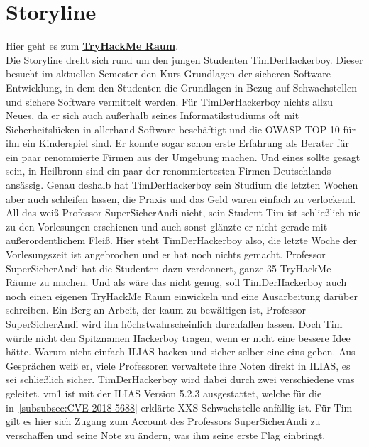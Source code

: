 \documentclass[10pt, a4paper,onecolumn ,titlepage]{article}
\begin{document}
    \section{Storyline}
    \label{sec:storyline}
    Hier geht es zum \href{https://tryhackme.com/jr/t1mth3h4ck3rb0y}{\textbf{TryHackMe Raum}}.\vspace{0.5cm}
    \\
    Die Storyline dreht sich rund um den jungen Studenten TimDerHackerboy.
    Dieser besucht im aktuellen Semester den Kurs \glqq Grundlagen der sicheren Software-Entwicklung\grqq, in dem den Studenten die Grundlagen in Bezug auf Schwachstellen und sichere Software vermittelt werden.
    Für TimDerHackerboy nichts allzu Neues, da er sich auch außerhalb seines Informatikstudiums oft mit Sicherheitslücken in allerhand Software beschäftigt und die OWASP TOP 10 für ihn ein Kinderspiel sind.
    Er konnte sogar schon erste Erfahrung als Berater für ein paar renommierte Firmen aus der Umgebung machen.
    Und eines sollte gesagt sein, in Heilbronn sind ein paar der renommiertesten Firmen Deutschlands ansässig.
    Genau deshalb hat TimDerHackerboy sein Studium die letzten Wochen aber auch schleifen lassen, die Praxis und das Geld waren einfach zu verlockend.
    All das weiß Professor SuperSicherAndi nicht, sein Student Tim ist schließlich nie zu den Vorlesungen erschienen und auch sonst glänzte er nicht gerade mit außerordentlichem Fleiß.
    Hier steht TimDerHackerboy also, die letzte Woche der Vorlesungszeit ist angebrochen und er hat noch nichts gemacht.
    Professor SuperSicherAndi hat die Studenten dazu verdonnert, ganze 35 TryHackMe Räume zu machen.
    Und als wäre das nicht genug, soll TimDerHackerboy auch noch einen eigenen TryHackMe Raum einwickeln und eine Ausarbeitung darüber schreiben.
    Ein Berg an Arbeit, der kaum zu bewältigen ist, Professor SuperSicherAndi wird ihn höchstwahrscheinlich durchfallen lassen.
    Doch Tim würde nicht den Spitznamen Hackerboy tragen, wenn er nicht eine bessere Idee hätte.
    Warum nicht einfach ILIAS hacken und sicher selber eine eins geben.
    Aus Gesprächen weiß er, viele Professoren verwaltete ihre Noten direkt in ILIAS, es sei schließlich sicher.
    TimDerHackerboy wird dabei durch zwei verschiedene \ac{vm}s geleitet.
    \ac{vm}1 ist mit der ILIAS Version 5.2.3 ausgestattet, welche für die in~\ref{subsubsec:CVE-2018-5688} erklärte XXS Schwachstelle anfällig ist.
    Für Tim gilt es hier sich Zugang zum Account des Professors SuperSicherAndi zu verschaffen und seine Note zu ändern, was ihm seine erste Flag einbringt.
\end{document}
